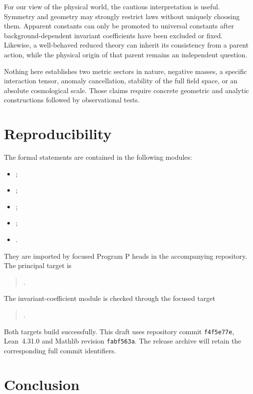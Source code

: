 \documentclass[11pt,a4paper]{article}
\theoremstyle{definition}
\theoremstyle{remark}
\begin{document}
For our view of the physical world, the cautious interpretation is useful.
Symmetry and geometry may strongly restrict laws without uniquely choosing
them. Apparent constants can only be promoted to universal constants after
background-dependent invariant coefficients have been excluded or fixed.
Likewise, a well-behaved reduced theory can inherit its consistency from a
parent action, while the physical origin of that parent remains an independent
question.

Nothing here establishes two metric sectors in nature, negative masses, a
specific interaction tensor, anomaly cancellation, stability of the full
field space, or an absolute cosmological scale. Those claims require concrete
geometric and analytic constructions followed by observational tests.

\section{Reproducibility}
\label{sec:reproducibility}

The formal statements are contained in the following modules:
\begin{itemize}
  \item {};
  \item {};
  \item {};
  \item {};
  \item {}.
\end{itemize}
They are imported by focused Program P heads in the accompanying repository.
The principal target is
\begin{quote}\small
{}.
\end{quote}
The invariant-coefficient module is checked through the focused target
\begin{quote}\small
{}.
\end{quote}
Both targets build successfully. This draft uses repository commit
\texttt{f4f5e77e}, Lean~4.31.0 and Mathlib revision \texttt{fabf563a}. The
release archive will retain the corresponding full commit identifiers.

\section{Conclusion}
\end{document}

